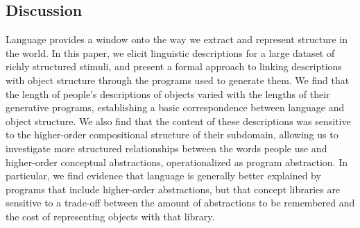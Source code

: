 \documentclass[10pt,letterpaper]{article}
\begin{document}






\subsection{Discussion}

Language provides a window onto the way we extract and represent structure in the world.
In this paper, we elicit linguistic descriptions for a large dataset of richly structured stimuli, and present a formal approach to linking descriptions with object structure through the programs used to generate them.
We find that the length of people's descriptions of objects varied with the lengths of their generative programs, establishing a basic correspondence between language and object structure.
We also find that the content of these descriptions was sensitive to the higher-order compositional structure of their subdomain, allowing us to investigate more structured relationships between the words people use and higher-order conceptual abstractions, operationalized as program abstraction.
In particular, we find evidence that language is generally better explained by programs that include higher-order abstractions, but that concept libraries are sensitive to a trade-off between the amount of abstractions to be remembered and the cost of representing objects with that library.
\end{document}
